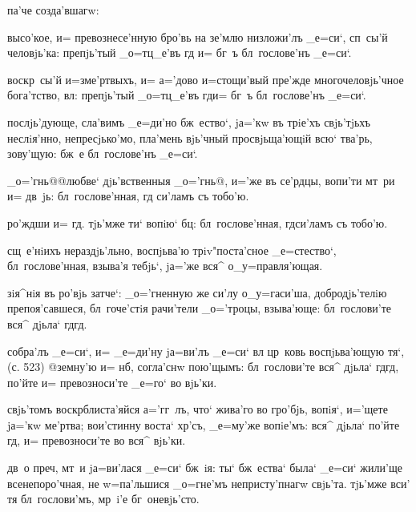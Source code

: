 па'че созда'вшагw:

высо'кое, и= превознесе'нную бро'вь на зе'млю низложи'лъ 
_е=си`, сп~сы'й человjь'ка: препjь'тый _о=тц_е'въ гд 
и= бг~ъ бл~гослове'нъ _е=си`.

воскр~сы'й и=з\ъ ме'ртвыхъ, и= а='дово и=стощи'вый 
пре'жде многочеловjь'чное бога'тство, вл: препjь'тый 
_о=тц_е'въ гд и= бг~ъ бл~гослове'нъ _е=си`.

послjь'дующе, сла'вимъ _е=ди'но бж~ество`, jа='кw въ 
трiе'хъ свjь'тjьхъ неслiя'нно, непресjько'мо, пла'мень 
вjь'чный просвjьща'ющiй всю` тва'рь, зову'щую: бж~е 
бл~гослове'нъ _е=си`.


_о='гнь@{@любве` дjь'вственныя _о='гнь@}, и='же въ 
се'рдцы, вопи'ти мт~ри и= дв~jь: бл~гослове'нная, гд 
си'ламъ съ тобо'ю.

ро'ждши и= гд. тjь'мже ти` вопiю` бц: 
бл~гослове'нная, гд си'ламъ съ тобо'ю.

сщ~е'нiихъ нераздjь'льно, воспjьва'ю трiv"поста'сное 
_е=стество`, бл~гослове'нная, взыва'я тебjь`, jа='же вся^ 
о_у=правля'ющая.


зiя^нiя въ ро'вjь затче`: _о='гненную же си'лу 
о_у=гаси'ша, добродjь'телiю препоя'савшеся, бл~гоче'стiя 
рачи'тели _о='троцы, взыва'юще: бл~гослови'те вся^ дjьла` 
гд гд.

собра'лъ _е=си`, и= _е=ди'ну jа=ви'лъ _е=си` вл 
цр~ковь воспjьва'ющую тя`, (с. 523) @земну'ю и= 
нб, согла'снw пою'щымъ: 
бл~гослови'те вся^ дjьла` гд гд, по'йте и= 
превозноси'те _е=го` во вjь'ки.

свjь'томъ воскр блиста'яйся а='гг~лъ, что` жива'го 
во гро'бjь, вопiя`, и='щете jа='кw ме'ртва; вои'стинну 
воста` хр'съ, _е=му'же вопiе'мъ: вся^ дjьла` по'йте 
гд, и= превозноси'те во вся^ вjь'ки.

дв~о преч, мт~и jа=ви'лася _е=си` бж~iя: ты` 
бж~ества` была` _е=си` жили'ще всенепоро'чная, не 
w=па'льшися _о=гне'мъ непристу'пнагw свjь'та. тjь'мже 
вси' тя бл~гослови'мъ, мр~i'е бг~оневjь'сто.

